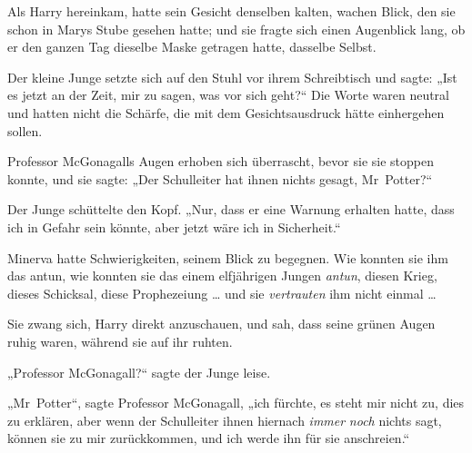 Als Harry hereinkam, hatte sein Gesicht denselben kalten, wachen Blick, den sie schon in Marys Stube gesehen hatte; und sie fragte sich einen Augenblick lang, ob er den ganzen Tag dieselbe Maske getragen hatte, dasselbe Selbst.

Der kleine Junge setzte sich auf den Stuhl vor ihrem Schreibtisch und sagte:
„Ist es jetzt an der Zeit, mir zu sagen, was vor sich geht?“ Die Worte waren neutral und hatten nicht die Schärfe, die mit dem Gesichtsausdruck hätte einhergehen sollen.

Professor McGonagalls Augen erhoben sich überrascht, bevor sie sie stoppen konnte, und sie sagte:
„Der Schulleiter hat ihnen nichts gesagt, Mr~Potter?“

Der Junge schüttelte den Kopf.
„Nur, dass er eine Warnung erhalten hatte, dass ich in Gefahr sein könnte, aber jetzt wäre ich in Sicherheit.“

Minerva hatte Schwierigkeiten, seinem Blick zu begegnen. Wie konnten sie ihm das antun, wie konnten sie das einem elfjährigen Jungen \emph{antun}, diesen Krieg, dieses Schicksal, diese Prophezeiung … und sie \emph{vertrauten} ihm nicht einmal …

Sie zwang sich, Harry direkt anzuschauen, und sah, dass seine grünen Augen ruhig waren, während sie auf ihr ruhten.

„Professor McGonagall?“ sagte der Junge leise.

„Mr~Potter“, sagte Professor McGonagall, „ich fürchte, es steht mir nicht zu, dies zu erklären, aber wenn der Schulleiter ihnen hiernach \emph{immer} \emph{noch} nichts sagt, können sie zu mir zurückkommen, und ich werde ihn für sie anschreien.“

